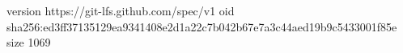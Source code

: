 version https://git-lfs.github.com/spec/v1
oid sha256:ed3ff37135129ea9341408e2d1a22c7b042b67e7a3c44aed19b9c5433001f85e
size 1069
